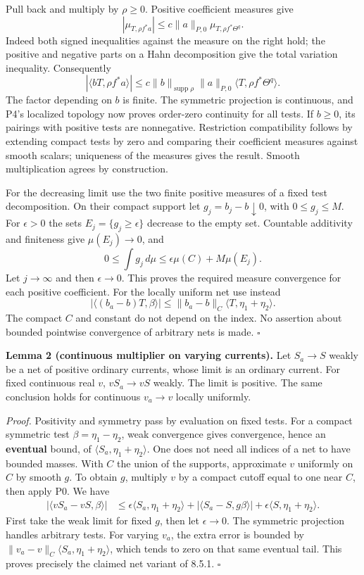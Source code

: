 \documentclass[
  11pt,
]{article}
\begin{document}
Pull back and multiply by \(\rho\geq0\). Positive coefficient measures
give \[|\mu_{T,\rho f^*a}|\leq c\|a\|_{P,0}\mu_{T,\rho f^*\Theta^q}.\]
Indeed both signed inequalities against the measure on the right hold;
the positive and negative parts on a Hahn decomposition give the total
variation inequality. Consequently \[ |\langle bT,\rho f^*a\rangle|
 \leq c\|b\|_{\operatorname{supp}\rho}\|a\|_{P,0}
          \langle T,\rho f^*\Theta^q\rangle.                   \tag{5}\]
The factor depending on \(b\) is finite. The symmetric projection is
continuous, and P4's localized topology now proves order-zero continuity
for all tests. If \(b\geq0\), its pairings with positive tests are
nonnegative. Restriction compatibility follows by extending compact
tests by zero and comparing their coefficient measures against smooth
scalars; uniqueness of the measures gives the result. Smooth
multiplication agrees by construction.

For the decreasing limit use the two finite positive measures of a fixed
test decomposition. On their compact support let
\(g_j=b_j-b\downarrow0\), with \(0\leq g_j\leq M\). For \(\epsilon>0\)
the sets \(E_j=\{g_j\geq\epsilon\}\) decrease to the empty set.
Countable additivity and finiteness give \(\mu(E_j)\to0\), and
\[0\leq\int g_j\,d\mu\leq\epsilon\mu(C)+M\mu(E_j).\] Let \(j\to\infty\)
and then \(\epsilon\to0\). This proves the required measure convergence
for each positive coefficient. For the locally uniform net use instead
\[ |\langle(b_a-b)T,\beta\rangle|
 \leq\|b_a-b\|_C\langle T,\eta_1+\eta_2\rangle.              \tag{6}\]
The compact \(C\) and constant do not depend on the index. No assertion
about bounded pointwise convergence of arbitrary nets is made.
\(\square\)

\textbf{Lemma 2 (continuous multiplier on varying currents).} Let
\(S_a\to S\) weakly be a net of positive ordinary currents, whose limit
is an ordinary current. For fixed continuous real \(v\), \(vS_a\to vS\)
weakly. The limit is positive. The same conclusion holds for continuous
\(v_a\to v\) locally uniformly.

\emph{Proof.} Positivity and symmetry pass by evaluation on fixed tests.
For a compact symmetric test \(\beta=\eta_1-\eta_2\), weak convergence
gives convergence, hence an \textbf{eventual} bound, of
\(\langle S_a,\eta_1+\eta_2\rangle\). One does not need all indices of a
net to have bounded masses. With \(C\) the union of the supports,
approximate \(v\) uniformly on \(C\) by smooth \(g\). To obtain \(g\),
multiply \(v\) by a compact cutoff equal to one near \(C\), then apply
P0. We have \[
\begin{split}
|\langle vS_a-vS,\beta\rangle|
 &\leq\epsilon\langle S_a,\eta_1+\eta_2\rangle
       +|\langle S_a-S,g\beta\rangle|
       +\epsilon\langle S,\eta_1+\eta_2\rangle.
\end{split}                                                    \tag{7}
\] First take the weak limit for fixed \(g\), then let \(\epsilon\to0\).
The symmetric projection handles arbitrary tests. For varying \(v_a\),
the extra error is bounded by
\(\|v_a-v\|_C\langle S_a,\eta_1+\eta_2\rangle\), which tends to zero on
that same eventual tail. This proves precisely the claimed net variant
of 8.5.1. \(\square\)
\end{document}
